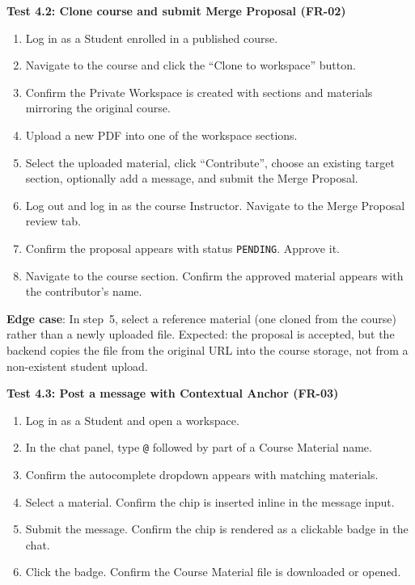 \bigskip
\noindent\textbf{Test 4.2: Clone course and submit Merge Proposal (FR-02)}
\begin{enumerate}
    \item Log in as a Student enrolled in a published course.
    \item Navigate to the course and click the ``Clone to workspace'' button.
    \item Confirm the Private Workspace is created with sections and materials mirroring the
          original course.
    \item Upload a new PDF into one of the workspace sections.
    \item Select the uploaded material, click ``Contribute'', choose an existing target section,
          optionally add a message, and submit the Merge Proposal.
    \item Log out and log in as the course Instructor. Navigate to the Merge Proposal review tab.
    \item Confirm the proposal appears with status \texttt{PENDING}. Approve it.
    \item Navigate to the course section. Confirm the approved material appears with the
          contributor's name.
\end{enumerate}

\noindent\textbf{Edge case}: In step~5, select a reference material (one cloned from the course)
rather than a newly uploaded file. Expected: the proposal is accepted, but the backend copies the
file from the original URL into the course storage, not from a non-existent student upload.

\bigskip
\noindent\textbf{Test 4.3: Post a message with Contextual Anchor (FR-03)}
\begin{enumerate}
    \item Log in as a Student and open a workspace.
    \item In the chat panel, type \texttt{@} followed by part of a Course Material name.
    \item Confirm the autocomplete dropdown appears with matching materials.
    \item Select a material. Confirm the chip is inserted inline in the message input.
    \item Submit the message. Confirm the chip is rendered as a clickable badge in the chat.
    \item Click the badge. Confirm the Course Material file is downloaded or opened.
\end{enumerate}

